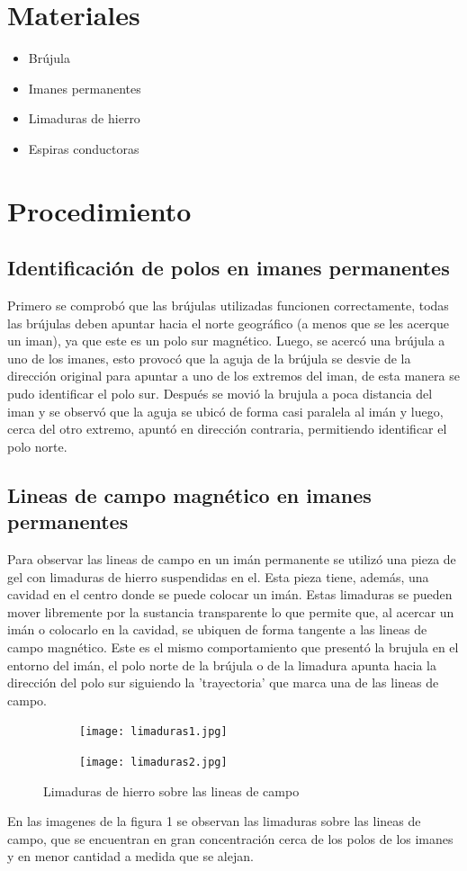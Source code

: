 \documentclass[11pt, letterpaper]{article}
\begin{document}
\section{Materiales}
\begin{itemize}
    \item Brújula
    \item Imanes permanentes
    \item Limaduras de hierro
    \item Espiras conductoras
\end{itemize}

\pagebreak

\section{Procedimiento}
\subsection{Identificación de polos en imanes permanentes}
Primero se comprobó que las brújulas utilizadas funcionen correctamente,
todas las brújulas deben apuntar hacia el norte geográfico (a menos que
se les acerque un iman), ya que este es un polo sur magnético.
Luego, se acercó una brújula a uno de los imanes, esto provocó que la
aguja de la brújula se desvie de la dirección original para apuntar
a uno de los extremos del iman, de esta manera se pudo identificar el
polo sur. Después se movió la brujula a poca distancia del iman y se
observó que la aguja se ubicó de forma casi paralela al imán y luego,
cerca del otro extremo, apuntó en dirección contraria, permitiendo 
identificar el polo norte.
\subsection{Lineas de campo magnético en imanes permanentes}
Para observar las lineas de campo en un imán permanente se utilizó
una pieza de gel con limaduras de hierro suspendidas en el. Esta pieza
tiene, además, una cavidad en el centro donde se puede colocar un imán.
Estas limaduras se pueden mover libremente por la sustancia transparente
lo que permite que, al acercar un imán o colocarlo en la cavidad, se 
ubiquen de forma tangente a las lineas de campo magnético. Este es
el mismo comportamiento que presentó la brujula en el entorno del imán,
el polo norte de la brújula o de la limadura apunta hacia la dirección
del polo sur siguiendo la 'trayectoria' que marca una de las lineas de
campo.\\
\begin{figure}[h]
    \centering
    \begin{subfigure}{0.4\linewidth}
        \texttt{[image: limaduras1.jpg]}
    \end{subfigure}
    \begin{subfigure}{0.4\linewidth}
        \texttt{[image: limaduras2.jpg]}
    \end{subfigure}
    \caption{Limaduras de hierro sobre las lineas de campo}
\end{figure}
En las imagenes de la figura 1 se observan las limaduras sobre las 
lineas de campo, que se encuentran en gran concentración cerca de los
polos de los imanes y en menor cantidad a medida que se alejan.
\end{document}
